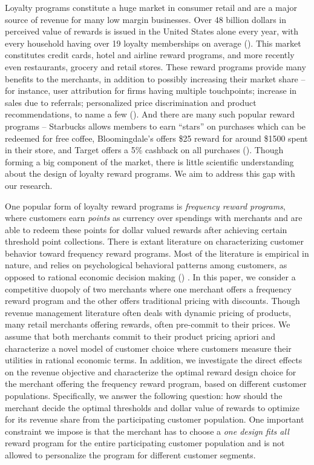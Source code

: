Loyalty programs constitute a huge market in consumer retail and are a major source of revenue for many low margin businesses.
Over 48 billion dollars in perceived value of rewards is issued in the United States alone every year, with every household having over 19 loyalty memberships on average (\cite{berry2013loyalty}).
This market constitutes credit cards, hotel and airline reward programs, and more recently even restaurants, grocery and retail stores.
These reward programs provide many benefits to the merchants, in addition to possibly increasing their market share -- for instance, user attribution for firms having multiple touchpoints; increase in sales due to referrals; personalized price discrimination and product recommendations, to name a few (\cite{ryu2007penny}).
And there are many such popular reward programs -- Starbucks allows members to earn ``stars'' on purchases which can be redeemed for free coffee, Bloomingdale's offers \$25 reward for around \$1500 spent in their store, and Target offers a 5\% cashback on all purchases (\cite{cvs2015target}).
Though forming a big component of the market, there is little scientific understanding about the design of loyalty reward programs. We aim to address this gap with our research.

One popular form of loyalty reward programs is \emph{frequency reward programs}, where customers earn \emph{points} as currency over spendings with merchants and are able to redeem these points for dollar valued rewards after achieving certain threshold point collections.
There is extant literature on characterizing customer behavior toward frequency reward programs.
Most of the literature is empirical in nature, and relies on psychological behavioral patterns among customers, as opposed to rational economic decision making (\cite{kivetz2006goal,dreze2004using,gao2014influence}) .
In this paper, we consider a competitive duopoly of two merchants where one merchant offers a frequency reward program and the other offers traditional pricing with discounts.
Though revenue management literature often deals with dynamic pricing of products, many retail merchants offering rewards, often pre-commit to their prices. 
We assume that both merchants commit to their product pricing apriori and characterize a novel model of customer choice where customers measure their utilities in rational economic terms.
In addition, we investigate the direct effects on the revenue objective and characterize the optimal reward design choice for the merchant offering the frequency reward program, based on different customer populations.
Specifically, we answer the following question: how should the merchant decide the optimal thresholds and dollar value of rewards to optimize for its revenue share from the participating customer population.
One important constraint we impose is that the merchant has to choose a \emph{one design fits all} reward program for the entire participating customer population and is not allowed to personalize the program for different customer segments.


